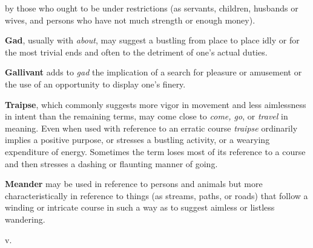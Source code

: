 \begin{description}[style=unboxed]
\begin{mynewitemize}
by those who ought to be under restrictions (as servants, children, husbands or
wives, and persons who have not much strength or enough money).
\item \textbf{Gad}, usually with \textit{about}, may suggest a bustling from
place to place idly or for the most trivial ends and often to the detriment of
one's actual duties.
\item \textbf{Gallivant} adds to \textit{gad} the implication of a search for
pleasure or amusement or the use of an opportunity to display one's finery.
\item \textbf{Traipse}, which commonly suggests more vigor in movement and less
aimlessness in intent than the remaining terms, may come close to \textit{come,
go}, or \textit{travel} in meaning. Even when used with reference to an erratic
course \textit{traipse} ordinarily implies a positive purpose, or stresses a
bustling activity, or a wearying expenditure of energy. Sometimes the term loses
most of its reference to a course and then stresses a dashing or flaunting
manner of going.
\item \textbf{Meander} may be used in reference to persons and animals but more
characteristically in reference to things (as streams, paths, or roads) that
follow a winding or intricate course in such a way as to suggest aimless or
listless wandering.
\end{mynewitemize}

 v.
\begin{mynewitemize}
\item
\item \textbf{}
\end{mynewitemize}









\end{description}
